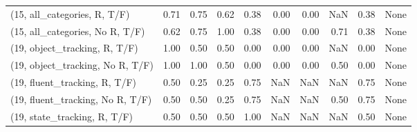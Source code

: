 \begin{table*}[h!]
\begin{adjustbox}{width=2\columnwidth,center}
\begin{tabular}{lrrr|rrr|rrr}
(15, all\_categories, R, T/F)          &                      0.71 &                  0.75 &                      0.62 &                          0.38 &                      0.00 &                          0.00 &                                    NaN &                               0.38 &                                  None \\
(15, all\_categories, No R, T/F)       &                      0.62 &                  0.75 &                      1.00 &                          0.38 &                      0.00 &                          0.00 &                                   0.71 &                               0.38 &                                  None \\



\midrule
(19, object\_tracking, R, T/F)         &                      1.00 &                  0.50 &                      0.50 &                          0.00 &                      0.00 &                          0.00 &                                    NaN &                               0.00 &                                  None \\
(19, object\_tracking, No R, T/F)      &                      1.00 &                  1.00 &                      0.50 &                          0.00 &                      0.00 &                          0.00 &                                   0.50 &                               0.00 &                                  None \\
(19, fluent\_tracking, R, T/F)         &                      0.50 &                  0.25 &                      0.25 &                          0.75 &                       NaN &                           NaN &                                    NaN &                               0.75 &                                  None \\
(19, fluent\_tracking, No R, T/F)      &                      0.50 &                  0.50 &                      0.25 &                          0.75 &                       NaN &                           NaN &                                   0.50 &                               0.75 &                                  None \\
(19, state\_tracking, R, T/F)          &                      0.50 &                  0.50 &                      0.50 &                          1.00 &                       NaN &                           NaN &                                    NaN &                               0.50 &                                  None \\

\end{tabular}
\end{adjustbox}
\end{table*}
